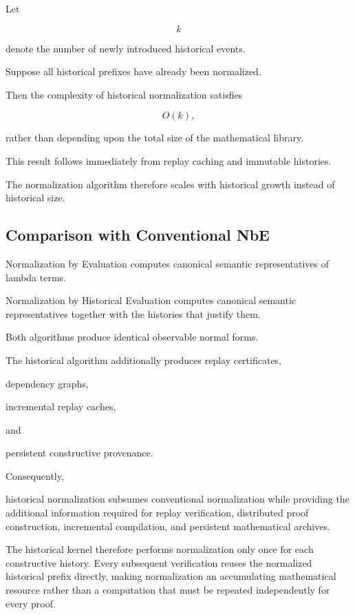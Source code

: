 \documentclass[12pt,oneside]{article}
\theoremstyle{definition}
\theoremstyle{remark}
\begin{document}
Let

\[
k
\]

denote the number of newly introduced historical events.

Suppose all historical prefixes have already been normalized.

Then the complexity of historical normalization satisfies

\[
O(k),
\]

rather than depending upon the total size of the mathematical library.

This result follows immediately from replay caching and immutable histories.

The normalization algorithm therefore scales with historical growth instead of
historical size.


\subsection{Comparison with Conventional NbE}

Normalization by Evaluation computes canonical semantic representatives of
lambda terms.

Normalization by Historical Evaluation computes canonical semantic
representatives together with the histories that justify them.

Both algorithms produce identical observable normal forms.

The historical algorithm additionally produces replay certificates,

dependency graphs,

incremental replay caches,

and

persistent constructive provenance.

Consequently,

historical normalization subsumes conventional normalization while providing
the additional information required for replay verification, distributed proof
construction, incremental compilation, and persistent mathematical archives.

The historical kernel therefore performs normalization only once for each
constructive history. Every subsequent verification reuses the normalized
historical prefix directly, making normalization an accumulating mathematical
resource rather than a computation that must be repeated independently for every
proof.
\end{document}
